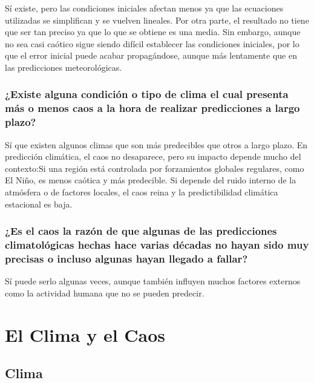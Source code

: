 \documentclass[
  10pt,
  a4paper,
  DIV=11,
  numbers=noendperiod,
  open=any]{scrreprt}
\numberwithin{equation}{chapter}
\numberwithin{equation}{section}
\renewcommand{\[}{\begin{equation}}
\renewcommand{\]}{\end{equation}}
\begin{document}
Sí existe, pero las condiciones iniciales afectan menos ya que las
ecuaciones utilizadas se simplifican y se vuelven lineales. Por otra
parte, el resultado no tiene que ser tan preciso ya que lo que se obtiene
es una media. Sin embargo, aunque no sea casi caótico sigue siendo
difícil establecer las condiciones iniciales, por lo que el error inicial
puede acabar propagándose, aunque más lentamente que en las predicciones
meteorológicas.

\section{¿Existe alguna condición o tipo de clima el cual presenta más o
menos caos a la hora de realizar predicciones a largo
plazo?}\label{existe-alguna-condiciuxf3n-o-tipo-de-clima-el-cual-presenta-muxe1s-o-menos-caos-a-la-hora-de-realizar-predicciones-a-largo-plazo}

Sí que existen algunos climas que son más predecibles que otros a largo
plazo. En predicción climática, el caos no desaparece, pero su impacto
depende mucho del contexto:Si una región está controlada por
forzamientos globales regulares, como El Niño, es menos caótica y más
predecible. Si depende del ruido interno de la atmósfera o de factores
locales, el caos reina y la predictibilidad climática estacional es
baja.

\section{¿Es el caos la razón de que algunas de las predicciones
climatológicas hechas hace varias décadas no hayan sido muy precisas o
incluso algunas hayan llegado a
fallar?}\label{es-el-caos-la-razuxf3n-de-que-algunas-de-las-predicciones-climatoluxf3gicas-hechas-hace-varias-duxe9cadas-no-hayan-sido-muy-precisas-o-incluso-algunas-hayan-llegado-a-fallar}

Sí puede serlo algunas veces, aunque también influyen muchos factores
externos como la actividad humana que no se pueden predecir.

\part{El Clima y el Caos}

\chapter{Clima}\label{clima}
\end{document}
